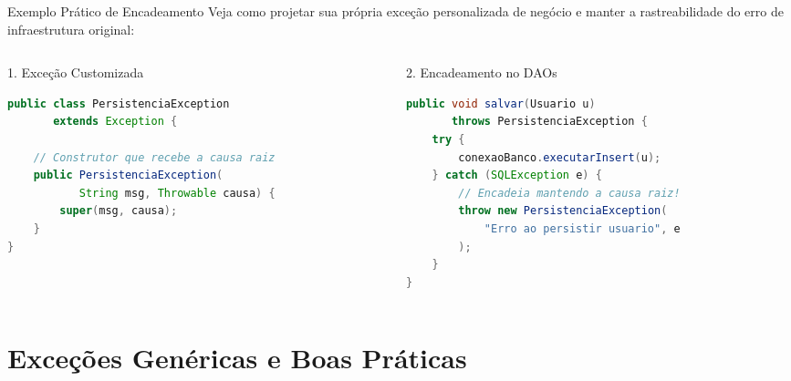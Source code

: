 \documentclass[9pt]{beamer}
\begin{document}
\begin{frame}[fragile]{Exemplo Prático de Encadeamento}
    Veja como projetar sua própria exceção personalizada de negócio e manter a rastreabilidade do erro de infraestrutura original:
    
    \vspace{0.15cm}
    
    \begin{columns}[t]
        \begin{column}{0.5\textwidth}
            \begin{block}{1. Exceção Customizada}
                \begin{lstlisting}[language=Java,numbers=none]
public class PersistenciaException 
       extends Exception {

    // Construtor que recebe a causa raiz
    public PersistenciaException(
           String msg, Throwable causa) {
        super(msg, causa);
    }
}
\end{lstlisting}
            \end{block}
        \end{column}
        
        \begin{column}{0.48\textwidth}
            \begin{block}{2. Encadeamento no DAOs}
                \begin{lstlisting}[language=Java,numbers=none]
public void salvar(Usuario u) 
       throws PersistenciaException {
    try {
        conexaoBanco.executarInsert(u);
    } catch (SQLException e) {
        // Encadeia mantendo a causa raiz!
        throw new PersistenciaException(
            "Erro ao persistir usuario", e
        );
    }
}
\end{lstlisting}
            \end{block}
        \end{column}
    \end{columns}
\end{frame}

\section{Exceções Genéricas e Boas Práticas}
\end{document}
